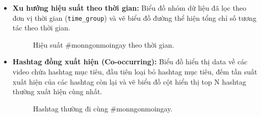 \begin{itemize}
        \item \textbf{Xu hướng hiệu suất theo thời gian:} Biểu đồ nhóm dữ liệu đã lọc theo đơn vị thời gian (\texttt{time\_group}) và vẽ biểu đồ đường thể hiện tổng chỉ số tương tác theo thời gian.
        \begin{figure}[H]
            \centering
            \caption{Hiệu suất \#monngonmoingay theo thời gian.}
        \end{figure}
        
        \item \textbf{Hashtag đồng xuất hiện (Co-occurring):} Biểu đồ hiển thị data về các video chứa hashtag mục tiêu, đầu tiên loại bỏ hashtag mục tiêu, đếm tần suất xuất hiện của các hashtag còn lại và vẽ biểu đồ cột hiển thị top N hashtag thường xuất hiện cùng nhất.
        \begin{figure}[H]
            \centering
            \caption{Hashtag thường đi cùng \#monngonmoingay.}
        \end{figure}
        

\end{itemize}
